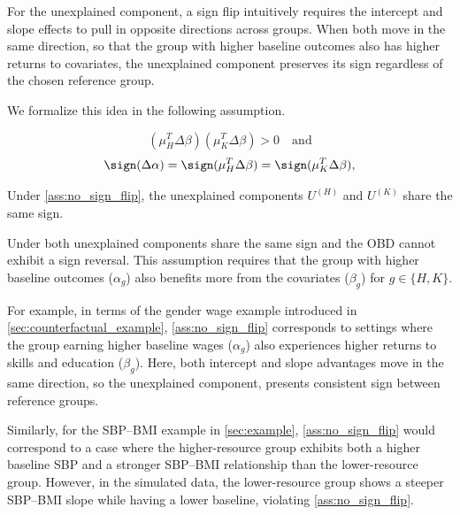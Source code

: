 For the unexplained component, a sign flip intuitively requires the intercept and slope effects to pull in opposite directions across groups. When both move in the same direction, so that the group with higher baseline outcomes also has higher returns to covariates, the unexplained component preserves its sign regardless of the chosen reference group.

We formalize this idea in the following assumption. 

\begin{assumption}
\label{ass:no_sign_flip}
\[
    (\mu_H^T \Delta\beta)(\mu_K^T \Delta\beta) > 0 
\quad \text{and}  
\]
\[
    \sign(\Delta\alpha) = \sign(\mu_H^T \Delta\beta) = \sign(\mu_K^T \Delta\beta),
\]
\end{assumption}

\begin{proposition}
    \label{prop:no_sign_flip}
    Under \cref{ass:no_sign_flip}, the unexplained components 
    \( U^{(H)}\) and  \(U^{(K)}\) share the same sign.
    \end{proposition}

Under  both unexplained components share the same sign and the OBD cannot exhibit a sign reversal. 
This assumption requires that the group with higher baseline outcomes ($\alpha_g$) also benefits more from the covariates ($\beta_g$) for \(g \in \{H,K\}\).

For example, in terms of the gender wage example introduced in \cref{sec:counterfactual_example}, \cref{ass:no_sign_flip} corresponds to settings where the group earning higher baseline wages ($\alpha_g$) also experiences higher returns to skills and education ($\beta_g$). 
Here, both intercept and slope advantages move in the same direction, so the unexplained component, presents consistent sign between reference groups. 

Similarly, for the SBP--BMI example in \cref{sec:example}, \cref{ass:no_sign_flip} would correspond to a case where the higher-resource group exhibits both a higher baseline SBP and a stronger SBP--BMI relationship than the lower-resource group. However, in the simulated data, the lower-resource group shows a steeper SBP--BMI slope while having a lower baseline, violating \cref{ass:no_sign_flip}.



